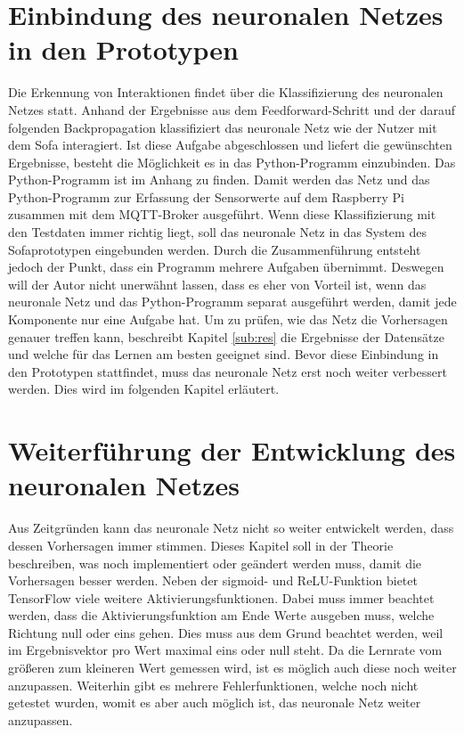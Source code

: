 \section{Einbindung des neuronalen Netzes in den Prototypen}
\label{sec:einb}
Die Erkennung von Interaktionen findet über die Klassifizierung des neuronalen Netzes statt. Anhand der Ergebnisse aus dem Feedforward-Schritt und der darauf folgenden Backpropagation klassifiziert das neuronale Netz wie der Nutzer mit dem Sofa interagiert. Ist diese Aufgabe abgeschlossen und liefert die gewünschten Ergebnisse, besteht die Möglichkeit es in das Python-Programm einzubinden. Das Python-Programm ist im Anhang zu finden. Damit werden das Netz und das Python-Programm zur Erfassung der Sensorwerte auf dem Raspberry Pi zusammen mit dem MQTT-Broker ausgeführt. 
\newline
Wenn diese Klassifizierung mit den Testdaten immer richtig liegt, soll das neuronale Netz in das System des Sofaprototypen eingebunden werden. Durch die Zusammenführung entsteht jedoch der Punkt, dass ein Programm mehrere Aufgaben übernimmt. Deswegen will der Autor nicht unerwähnt lassen, dass es eher von Vorteil ist, wenn das neuronale Netz und das Python-Programm separat ausgeführt werden, damit jede Komponente nur eine Aufgabe hat.
\newline
Um zu prüfen, wie das Netz die Vorhersagen genauer treffen kann, beschreibt Kapitel \ref{sub:res} die Ergebnisse der Datensätze und welche für das Lernen am besten geeignet sind. Bevor diese Einbindung in den Prototypen stattfindet, muss das neuronale Netz erst noch weiter verbessert werden. Dies wird im folgenden Kapitel erläutert.

\section{Weiterführung der Entwicklung des neuronalen Netzes}
Aus Zeitgründen kann das neuronale Netz nicht so weiter entwickelt werden, dass dessen Vorhersagen immer stimmen. Dieses Kapitel soll in der Theorie beschreiben, was noch implementiert oder geändert werden muss, damit die Vorhersagen besser werden.
\newline
\newline
Neben der sigmoid- und ReLU-Funktion bietet TensorFlow viele weitere Aktivierungsfunktionen. Dabei muss immer beachtet werden, dass die Aktivierungsfunktion am Ende Werte ausgeben muss, welche Richtung null oder eins gehen. Dies muss aus dem Grund beachtet werden, weil im Ergebnisvektor pro Wert maximal eins oder null steht. Da die Lernrate vom größeren zum kleineren Wert gemessen wird, ist es möglich auch diese noch weiter anzupassen. Weiterhin gibt es mehrere Fehlerfunktionen, welche noch nicht getestet wurden, womit es aber auch möglich ist, das neuronale Netz weiter anzupassen.

